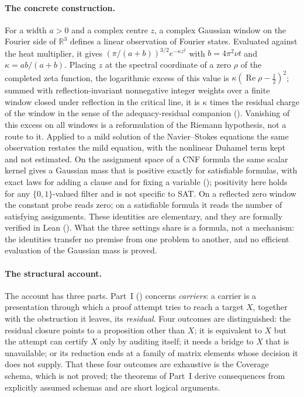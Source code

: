 \paragraph{The concrete construction.}  For a width \(a>0\) and a
complex centre \(z\), a complex Gaussian window on the Fourier side of
\(\mathbb R^{3}\) defines a linear observation of Fourier states.
Evaluated against the heat multiplier, it gives
\((\pi/(a+b))^{3/2}e^{-\kappa z^{2}}\) with \(b=4\pi^{2}\nu t\) and
\(\kappa=ab/(a+b)\).  Placing \(z\) at the spectral coordinate of a zero
\(\rho\) of the completed zeta function, the logarithmic excess of this
value is \(\kappa(\operatorname{Re}\rho-\frac12)^{2}\); summed with
reflection-invariant nonnegative integer weights over a finite window closed under
reflection in the critical line, it is \(\kappa\) times
the residual charge of the window in the sense of the
adequacy-residual companion \cite{Tsiokos2026XiCompanion}
().  Vanishing of this excess on all
windows is a reformulation of the Riemann hypothesis, not a route to
it.  Applied to a mild solution of the Navier--Stokes equations the
same observation restates the mild equation, with the nonlinear Duhamel
term kept and not estimated.  On the assignment space of a CNF formula
the same scalar kernel gives a Gaussian mass that is positive exactly
for satisfiable formulas, with exact laws for adding a clause and for
fixing a variable (); positivity
here holds for any \(\{0,1\}\)-valued filter and is not specific to
SAT.  On a reflected
zero window the constant probe reads zero; on a satisfiable formula it
reads the number of satisfying assignments.  These identities are
elementary, and they are formally verified in Lean
().  What the three settings share is a
formula, not a mechanism: the identities transfer no premise from one
problem to another, and no efficient evaluation of the Gaussian mass is
proved.

\paragraph{The structural account.}  The account has three parts.
Part~I () concerns \emph{carriers}: a carrier is a
presentation through which a proof attempt tries to reach a target
\(X\), together with the obstruction it leaves, its \emph{residual}.
Four outcomes are distinguished: the residual closure points to a
proposition other than \(X\); it is equivalent to \(X\) but the attempt
can certify \(X\) only by auditing itself; it needs a bridge to \(X\)
that is unavailable; or its reduction ends at a family of matrix
elements whose decision it does not supply.  That these four outcomes
are exhaustive is the Coverage schema, which is not proved; the
theorems of Part~I derive consequences from explicitly assumed schemas
and are short logical arguments.

